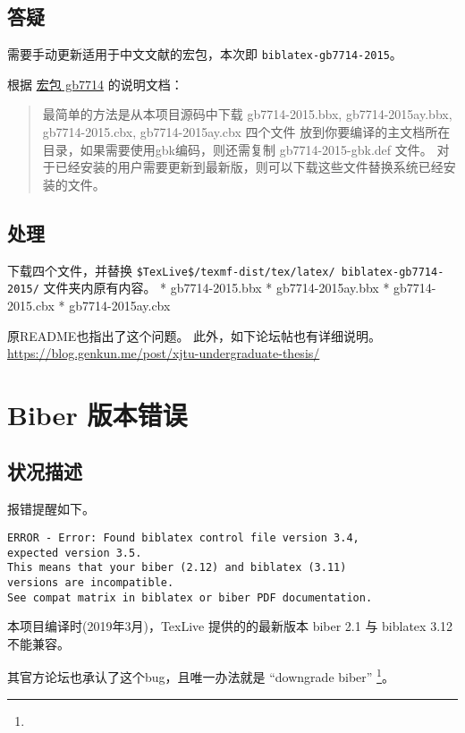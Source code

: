 \documentclass[../Main/thesis.tex]{subfiles}
\begin{document}
\subsection{答疑}

需要手动更新适用于中文文献的宏包，本次即 \texttt{biblatex-gb7714-2015}。

根据 \href{https://github.com/hushidong/biblatex-gb7714-2015}{宏包
gb7714} 的说明文档：

\begin{quote}
最简单的方法是从本项目源码中下载 gb7714-2015.bbx, gb7714-2015ay.bbx,
gb7714-2015.cbx, gb7714-2015ay.cbx 四个文件
放到你要编译的主文档所在目录，如果需要使用gbk编码，则还需复制
gb7714-2015-gbk.def 文件。
对于已经安装的用户需要更新到最新版，则可以下载这些文件替换系统已经安装的文件。
\end{quote}

\subsection{处理}

下载四个文件，并替换 \texttt{\$TexLive\$/texmf-dist/tex/latex/
biblatex-gb7714-2015/}
文件夹内原有内容。 * gb7714-2015.bbx * gb7714-2015ay.bbx *
gb7714-2015.cbx * gb7714-2015ay.cbx

原README也指出了这个问题。 此外，如下论坛帖也有详细说明。
\url{https://blog.genkun.me/post/xjtu-undergraduate-thesis/}

\section{Biber 版本错误}

\subsection{状况描述}

报错提醒如下。

\begin{verbatim}
ERROR - Error: Found biblatex control file version 3.4,
expected version 3.5.
This means that your biber (2.12) and biblatex (3.11)
versions are incompatible.
See compat matrix in biblatex or biber PDF documentation.
\end{verbatim}

本项目编译时(2019年3月)，TexLive 提供的的最新版本 biber 2.1 与 biblatex
3.12 不能兼容。

其官方论坛也承认了这个bug，且唯一办法就是 ``downgrade biber'' \footnote{}。
\end{document}

